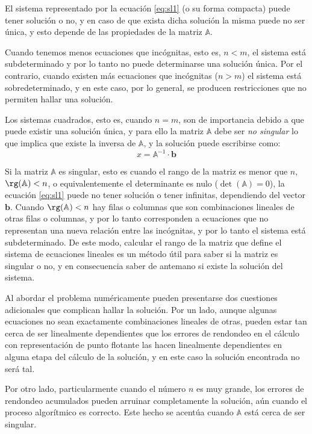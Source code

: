 El sistema representado por la ecuación \eqref{eq:sl1} (o su forma compacta) puede tener solución o no, y en caso de que exista dicha solución la misma puede no ser única, y esto depende de las propiedades de la matriz $\mathbb{A}$.

Cuando tenemos menos ecuaciones que incógnitas, esto es, $n < m$, el sistema está subdeterminado y por lo tanto no puede determinarse una solución única. Por el contrario, cuando existen más ecuaciones que incógnitas ($n > m$) el sistema está sobredeterminado, y en este caso, por lo general, se producen restricciones que no permiten hallar una solución.

Los sistemas cuadrados, esto es, cuando $n = m$, son de importancia debido a que puede existir una solución única, y para ello la matriz $\mathbb{A}$ debe ser \textit{no singular} lo que implica que existe la inversa de $\mathbb{A}$, y la solución puede escribirse como:
\begin{equation}
 x = \mathbb{A}^{-1} \cdot \bm{b}
\end{equation} 

Si la matriz $\mathbb{A}$ es singular, esto es cuando el rango de la matriz es menor que $n$, $\rg(\mathbb{A}) < n$, o equivalentemente el determinante es nulo ($\det(\mathbb{A}) = 0$), la ecuación \eqref{eq:sl1} puede no tener solución o tener infinitas, dependiendo del vector $\bm{b}$. Cuando $\rg(\mathbb{A}) < n$ hay filas o columnas que son combinaciones lineales de otras filas o columnas, y por lo tanto corresponden a ecuaciones que no representan una nueva relación entre las incógnitas, y por lo tanto el sistema está subdeterminado. De este modo, calcular el rango de la matriz que define el sistema de ecuaciones lineales es un método útil para saber si la matriz es singular o no, y en consecuencia saber de antemano si existe la solución del sistema.

Al abordar el problema numéricamente pueden presentarse dos cuestiones adicionales que complican hallar la solución. Por un lado, aunque algunas ecuaciones no sean exactamente combinaciones lineales de otras, pueden estar tan cerca de ser linealmente dependientes que los errores de rendondeo en el cálculo con representación de punto flotante las hacen linealmente dependientes en alguna etapa del cálculo de la solución, y en este caso la solución encontrada no será tal. 

Por otro lado, particularmente cuando el número $n$ es muy grande, los errores de rendondeo acumulados pueden arruinar completamente la solución, aún cuando el proceso algorítmico es correcto. Este hecho se acentúa cuando $\mathbb{A}$ está cerca de ser singular.


